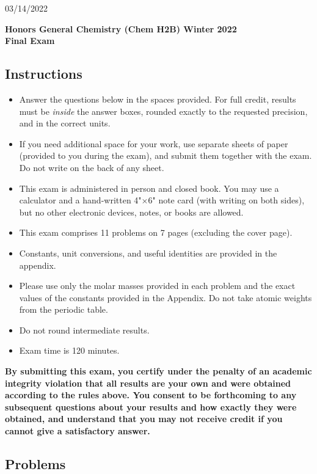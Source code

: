 \documentclass[11pt]{article}
\newcounter{problem}
\begin{document}
\hfill 03/14/2022
\begin{center}
\textbf{\large Honors General Chemistry (Chem H2B) Winter
  2022 \\ Final Exam}
\end{center}

\subsection*{Instructions}

\begin{itemize}
\item Answer the questions below in the spaces provided. For full
  credit, results must be \emph{inside} the answer boxes, rounded exactly
  to the requested precision, and in the correct units. 
\item If you need additional space for your work, use separate sheets of
  paper (provided to you during the exam), and submit them together with
  the exam. Do not write on the back of any sheet.
\item This exam is administered in person and closed book. You may use a
  calculator and a hand-written 4"$\times$6" note card (with writing on
  both sides), but no other electronic devices, notes, or books are
  allowed. 
\item This exam comprises 11 problems on 7 pages (excluding the cover page).
\item Constants, unit conversions, and useful identities are provided in
  the appendix. 
\item Please use only the molar masses provided in each
  problem and the exact values of the constants provided in the
  Appendix. Do not take atomic weights from the periodic table.
\item Do not round intermediate results.
\item Exam time is 120 minutes.
\end{itemize}

\vfill

\textbf{By submitting this exam, you certify under the penalty of an
  academic integrity violation that all results are your
  own and were obtained according to the rules above. You consent to
  be forthcoming to any subsequent questions about your results and how
  exactly they were obtained, and understand that you may not receive
  credit if you cannot give a satisfactory answer.}

\vfill

\subsection*{Problems}
\end{document}
